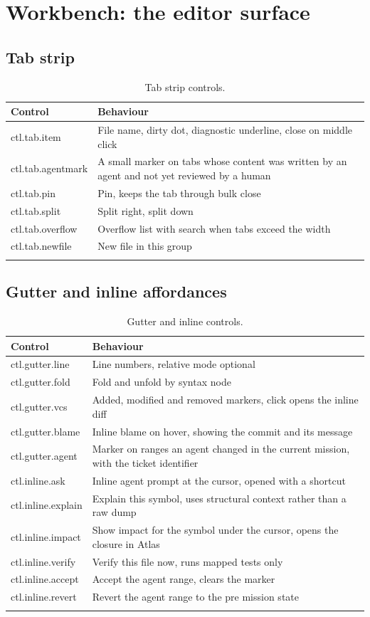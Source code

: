 \section{Workbench: the editor surface}

\subsection{Tab strip}

\begin{longtable}{@{}p{} p{}@{}}
\toprule
\textbf{Control} & \textbf{Behaviour} \\
\midrule
\endhead
ctl.tab.item & File name, dirty dot, diagnostic underline, close on middle click \\
ctl.tab.agentmark & A small marker on tabs whose content was written by an agent and not yet reviewed by a human \\
ctl.tab.pin & Pin, keeps the tab through bulk close \\
ctl.tab.split & Split right, split down \\
ctl.tab.overflow & Overflow list with search when tabs exceed the width \\
ctl.tab.newfile & New file in this group \\
\bottomrule
\caption{Tab strip controls.}
\end{longtable}

\subsection{Gutter and inline affordances}

\begin{longtable}{@{}p{} p{}@{}}
\toprule
\textbf{Control} & \textbf{Behaviour} \\
\midrule
\endhead
ctl.gutter.line & Line numbers, relative mode optional \\
ctl.gutter.fold & Fold and unfold by syntax node \\
ctl.gutter.vcs & Added, modified and removed markers, click opens the inline diff \\
ctl.gutter.blame & Inline blame on hover, showing the commit and its message \\
ctl.gutter.agent & Marker on ranges an agent changed in the current mission, with the ticket identifier \\
ctl.inline.ask & Inline agent prompt at the cursor, opened with a shortcut \\
ctl.inline.explain & Explain this symbol, uses structural context rather than a raw dump \\
ctl.inline.impact & Show impact for the symbol under the cursor, opens the closure in Atlas \\
ctl.inline.verify & Verify this file now, runs mapped tests only \\
ctl.inline.accept & Accept the agent range, clears the marker \\
ctl.inline.revert & Revert the agent range to the pre mission state \\
\bottomrule
\caption{Gutter and inline controls.}
\end{longtable}

